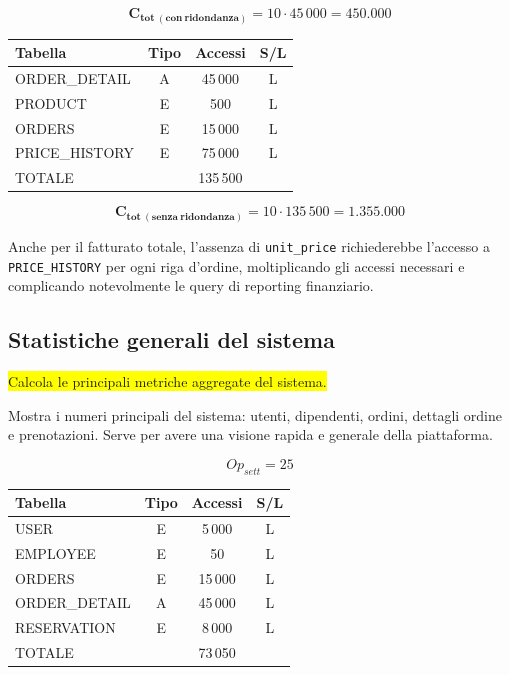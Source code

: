 \documentclass[a4paper,12pt]{report}
\begin{document}
$$\mathbf{C_{tot\ (con\ ridondanza)}} = 10 \cdot 45\,000 = \mathbf{450.000}$$

\begin{table}[H]
  \centering
  \small
  \renewcommand{\arraystretch}{1.15}
  \begin{tabularx}{0.9\textwidth}{|X|c|c|c|}
    \hline
    \rowcolor{gray!20}
    \textbf{Tabella} & \textbf{Tipo} & \textbf{Accessi} & \textbf{S/L} \\
    \hline
    ORDER\_DETAIL & A & 45\,000 & L \\
    PRODUCT & E & 500 & L \\
    ORDERS & E & 15\,000 & L \\
    PRICE\_HISTORY & E & 75\,000 & L \\
    \hline
    \rowcolor{gray!20}
    TOTALE & & 135\,500 & \\
    \hline
  \end{tabularx}
  \vspace{-1em}
\end{table}

$$\mathbf{C_{tot\ (senza\ ridondanza)}} = 10 \cdot 135\,500 = \mathbf{1.355.000}$$

Anche per il fatturato totale, l'assenza di \texttt{unit\_price} richiederebbe l'accesso
a \texttt{PRICE\_HISTORY} per ogni riga d'ordine, moltiplicando gli accessi necessari e complicando notevolmente le query di reporting finanziario.

\subsection*{Statistiche generali del sistema} \label{op6}
\colorbox{yellow}{Calcola le principali metriche aggregate del sistema.}

Mostra i numeri principali del sistema: utenti, dipendenti, ordini,
dettagli ordine e prenotazioni. Serve per avere una visione rapida e
generale della piattaforma.

$$Op_{sett} = 25$$

\begin{table}[H]
  \centering
  \small
  \renewcommand{\arraystretch}{1.15}
  \begin{tabularx}{0.9\textwidth}{|X|c|c|c|}
    \hline
    \rowcolor{gray!20}
    \textbf{Tabella} & \textbf{Tipo} & \textbf{Accessi} & \textbf{S/L} \\
    \hline
    USER & E & 5\,000 & L \\
    EMPLOYEE & E & 50 & L \\
    ORDERS & E & 15\,000 & L \\
    ORDER\_DETAIL & A & 45\,000 & L \\
    RESERVATION & E & 8\,000 & L \\
    \hline
    \rowcolor{gray!20}
    TOTALE & & 73\,050 & \\
    \hline
  \end{tabularx}
  \vspace{-1em}
\end{table}
\end{document}
